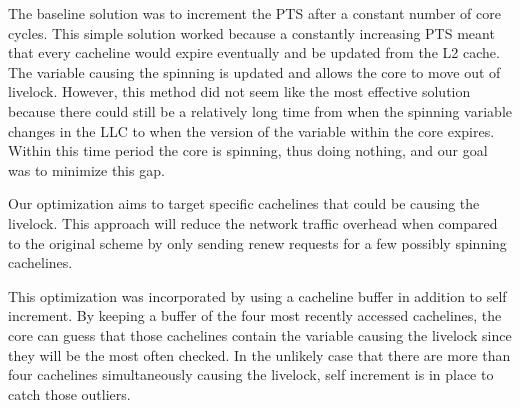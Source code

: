 \documentclass[12pt]{article}
\begin{document}
	The baseline solution was to increment the PTS after a constant number of core cycles. This simple solution worked because a constantly increasing PTS meant that every cacheline would expire eventually and be updated from the L2 cache. The variable causing the spinning is updated and allows the core to move out of livelock. However, this method did not seem like the most effective solution because there could still be a relatively long time from when the spinning variable changes in the LLC to when the version of the variable within the core expires. Within this time period the core is spinning, thus doing nothing, and our goal was to minimize this gap. 
	
	
	
	

	
	Our optimization aims to target specific cachelines that could be causing the livelock. This approach will reduce the network traffic overhead when compared to the original scheme by only sending renew requests for a few possibly spinning cachelines.
	
    This optimization was incorporated by using a cacheline buffer in addition to self increment. By keeping a buffer of the four most recently accessed cachelines, the core can guess that those cachelines contain the variable causing the livelock since they will be the most often checked. In the unlikely case that there are more than four cachelines simultaneously causing the livelock, self increment is in place to catch those outliers.
\end{document}
